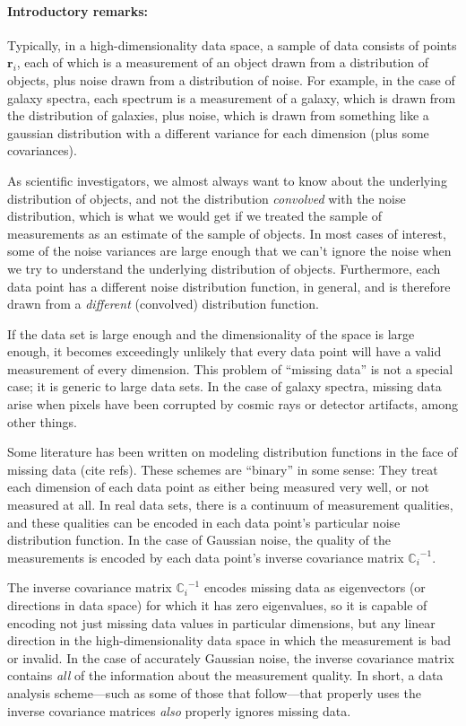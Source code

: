\documentclass[12pt]{article}
\newcommand{\Mvector}[1]{\boldsymbol{#1}}
\newcommand{\measurement}{\Mvector{r}}
\newcommand{\measurementi}{\measurement_i}
\newcommand{\Mmatrix}[1]{\mathbb{#1}}
\newcommand{\covari}{\Mmatrix{C}_i}
\newcommand{\inverse}[1]{{#1}^{-1}}
\newcommand{\invcovari}{\inverse{\covari}}
\begin{document}
\paragraph{Introductory remarks:}
Typically, in a high-dimensionality data space, a sample of data
consists of points $\measurementi$, each of which is a measurement of an
object drawn from a distribution of objects, plus noise drawn from a
distribution of noise.  For example, in the case of galaxy spectra,
each spectrum is a measurement of a galaxy, which is drawn from the
distribution of galaxies, plus noise, which is drawn from something
like a gaussian distribution with a different variance for each
dimension (plus some covariances).

As scientific investigators, we almost always want to know about the
underlying distribution of objects, and not the distribution
\emph{convolved} with the noise distribution, which is what we would
get if we treated the sample of measurements as an estimate of the
sample of objects.  In most cases of interest, some of the noise
variances are large enough that we can't ignore the noise when we try
to understand the underlying distribution of objects.  Furthermore,
each data point has a different noise distribution function, in
general, and is therefore drawn from a \emph{different} (convolved)
distribution function.

If the data set is large enough and the dimensionality of the space is
large enough, it becomes exceedingly unlikely that every data point
will have a valid measurement of every dimension.  This problem of
``missing data'' is not a special case; it is generic to large data
sets.  In the case of galaxy spectra, missing data arise when pixels
have been corrupted by cosmic rays or detector artifacts, among other
things.

Some literature has been written on modeling distribution functions in
the face of missing data (cite refs).  These schemes are
``binary'' in some sense: They treat each dimension of each data point
as either being measured very well, or not measured at all.  In real
data sets, there is a continuum of measurement qualities, and these
qualities can be encoded in each data point's particular noise
distribution function.  In the case of Gaussian noise, the quality of
the measurements is encoded by each data point's inverse covariance
matrix $\invcovari$.

The inverse covariance matrix $\invcovari$ encodes missing data as
eigenvectors (or directions in data space) for which it has zero
eigenvalues, so it is capable of encoding not just missing data values
in particular dimensions, but any linear direction in the
high-dimensionality data space in which the measurement is bad or
invalid.  In the case of accurately Gaussian noise, the inverse
covariance matrix contains \emph{all} of the information about the
measurement quality.  In short, a data analysis scheme---such as some
of those that follow---that properly uses the inverse covariance
matrices \emph{also} properly ignores missing data.
\end{document}
